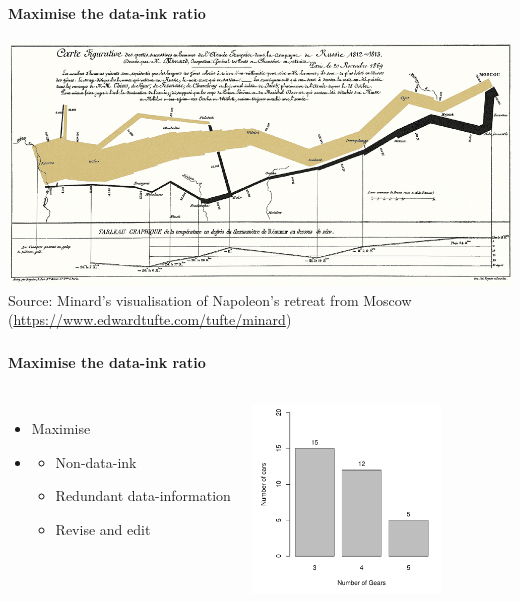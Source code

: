 \documentclass[8pt]{beamer}
\begin{document}

\begin{frame}
\frametitle{\insertsection}
\framesubtitle{Maximise the data-ink ratio}

\centering
\includegraphics[width=0.9\linewidth]{minard}\\
\tiny{Source: Minard's visualisation of Napoleon's retreat from Moscow (\url{https://www.edwardtufte.com/tufte/minard})}
  
\end{frame}



\begin{frame}
\frametitle{\insertsection}
\framesubtitle{Maximise the data-ink ratio}

\begin{columns}
\begin{itemize}
\item Maximise {\color{blue}{data-ink ratio}}
\item {\color{blue}{Erasing principles}} \cite{Tufte2001}
    \begin{itemize}
    \item Non-data-ink
    \item Redundant data-information
    \item Revise and edit
    \end{itemize}
\end{itemize}

\centering
\includegraphics[width=5cm]{data_ink_b}\\

\end{columns}

  
\end{frame}
\end{document}
